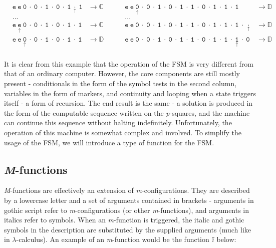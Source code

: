 \documentclass[Master.tex]{subfiles}
\begin{document}
\begin{equation*}
\begin{aligned}
&\mathtt{e\ e\ 0\ \cdot\ 0\ \cdot\ 1\ \cdot\ 0\ \cdot\ 1\ \underset{\uparrow}{\cdot}\ 1} & \rightarrow \mathbb{C}\ \ \ \ \ \ \ \ \ \ & \mathtt{e\ e\ \underset{\uparrow}{0}\ \cdot\ 0\ \cdot\ 1\ \cdot\ 0\ \cdot\ 1\ \cdot\ 1\ \cdot\ 0\ \cdot\ 1\ \cdot\ 1\ \cdot\ 1} & \rightarrow \mathbb{D}\\
&...& &...&\\
&\mathtt{e\ \underset{\uparrow}{e}\ 0\ \cdot\ 0\ \cdot\ 1\ \cdot\ 0\ \cdot\ 1\ \cdot\ 1} & \rightarrow \mathbb{C}\ \ \ \ \ \ \ \ \ \ & \mathtt{e\ e\ 0\ \cdot\ 0\ \cdot\ 1\ \cdot\ 0\ \cdot\ 1\ \cdot\ 1\ \cdot\ 0\ \cdot\ 1\ \cdot\ 1\ \cdot\ 1\ \cdot\ \underset{\uparrow}{\cdot}} & \rightarrow \mathbb{D}\\
&\mathtt{e\ e\ \underset{\uparrow}{0}\ \cdot\ 0\ \cdot\ 1\ \cdot\ 0\ \cdot\ 1\ \cdot\ 1} & \rightarrow \mathbb{D}\ \ \ \ \ \ \ \ \ \ & \mathtt{e\ e\ 0\ \cdot\ 0\ \cdot\ 1\ \cdot\ 0\ \cdot\ 1\ \cdot\ 1\ \cdot\ 0\ \cdot\ 1\ \cdot\ 1\ \cdot\ \underset{\uparrow}{1}\ \cdot\ 0} & \rightarrow \mathbb{D}\\
\end{aligned}
\end{equation*}

\clearpage

It is clear from this example that the operation of the FSM is very different from that of an ordinary computer. However, the core components are still mostly present - conditionals in the form of the symbol tests in the second column, variables in the form of markers, and continuity and looping when a state triggers itself - a form of recursion. The end result is the same - a solution is produced in the form of the computable sequence written on the \textit{p}-squares, and the machine can continue this sequence without halting indefinitely. Unfortunately, the operation of this machine is somewhat complex and involved. To simplify the usage of the FSM, we will introduce a type of function for the FSM.

\subsection{\textit{M}-functions}\label{sec:mfunctions}

\textit{M}-functions are effectively an extension of \textit{m}-configurations. They are described by a lowercase letter and a set of arguments contained in brackets - arguments in gothic script refer to \textit{m}-configurations (or other \textit{m}-functions), and arguments in italics refer to symbols. When an \textit{m}-function is triggered, the italic and gothic symbols in the description are substituted by the supplied arguments (much like in $\lambda$-calculus). An example of an \textit{m}-function would be the function $\mathbb{f}$ below:
\end{document}
